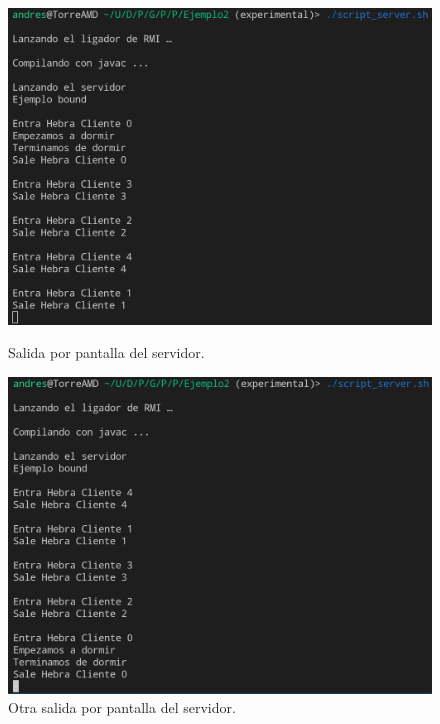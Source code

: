 \documentclass{article}
\begin{document}
\begin{figure}[H]
    \centering
    \begin{minipage}[H]{0.45\textwidth}
        \centering
        \includegraphics[width=\textwidth]{imagenes/E2ServerSync1.png}
        \caption{Salida por pantalla del servidor.}
    \end{minipage}
    \hfill
    \begin{minipage}[H]{0.45\textwidth}
        \centering
        \includegraphics[width=\textwidth]{imagenes/E2ServerSync2.png}
        \caption{Otra salida por pantalla del servidor.}
    \end{minipage}
\end{figure}
\end{document}
